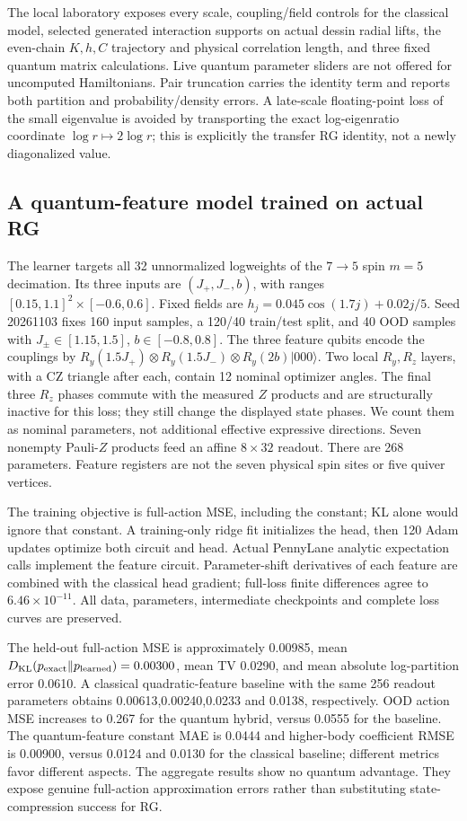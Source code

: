 The local laboratory exposes every scale, coupling/field controls for the
classical model, selected generated interaction supports on actual dessin
radial lifts, the even-chain $ K,h,C $ trajectory and physical correlation
length, and three fixed quantum matrix calculations. Live quantum parameter
sliders are not offered for uncomputed Hamiltonians. Pair truncation carries
the identity term and reports both partition and probability/density errors.
A late-scale floating-point loss of the small eigenvalue is avoided by
transporting the exact log-eigenratio coordinate $\log r\mapsto 2\log r $;
this is explicitly the transfer RG identity, not a newly diagonalized value.

\subsection{A quantum-feature model trained on actual RG}
The learner targets all 32 unnormalized logweights of the $7\to 5$ spin
$ m=5$ decimation. Its three inputs are $(J_+,J_-,b)$, with ranges
$[0.15,1.1]^2\times[-0.6,0.6]$. Fixed fields are
$ h_j=0.045\cos(1.7 j)+0.02 j/5$. Seed 20261103 fixes 160 input samples, a
120/40 train/test split, and 40 OOD samples with $ J_\pm\in[1.15,1.5]$,
$ b\in[-0.8,0.8]$. The three feature qubits encode the couplings by
$ R_y(1.5 J_+)\otimes R_y(1.5 J_-)\otimes R_y(2 b)|000\rangle $.
Two local $ R_y,R_z $ layers, with a CZ triangle after each, contain 12
nominal optimizer angles. The final three $ R_z $ phases commute with the
measured $ Z $ products and are structurally inactive for this loss; they
still change the displayed state phases. We count them as nominal
parameters, not additional effective expressive directions. Seven nonempty Pauli-$ Z $ products feed an affine
$8\times 32$ readout. There are 268 parameters. Feature registers are not
the seven physical spin sites or five quiver vertices.

The training objective is full-action MSE, including the constant; KL alone
would ignore that constant. A training-only ridge fit initializes the head,
then 120 Adam updates optimize both circuit and head. Actual PennyLane
analytic expectation calls implement the feature circuit. Parameter-shift
derivatives of each feature are combined with the classical head gradient;
full-loss finite differences agree to $6.46\times 10^{-11}$. All data,
parameters, intermediate checkpoints and complete loss curves are preserved.

The held-out full-action MSE is approximately 0.00985, mean
$ D_{\mathrm{KL}}(p_{\rm exact}\Vert p_{\rm learned})=0.00300$, mean TV 0.0290,
and mean absolute log-partition error 0.0610. A classical quadratic-feature
baseline with the same 256 readout parameters obtains 0.00613,0.00240,0.0233
and 0.0138, respectively. OOD action MSE increases to 0.267 for the quantum
hybrid, versus 0.0555 for the baseline. The quantum-feature constant MAE is 0.0444 and higher-body coefficient
RMSE is 0.00900, versus 0.0124 and 0.0130 for the classical baseline; different
metrics favor different aspects. The aggregate results show no quantum
advantage. They expose genuine full-action approximation errors rather
than substituting state-compression success for RG.

